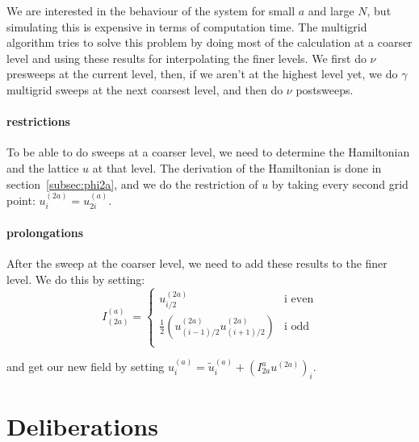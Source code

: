 \documentclass{scrartcl}
\begin{document}
We are interested in the behaviour of the system for small $a$ and large $N$, but simulating this is expensive in terms of computation time. The multigrid algorithm tries to solve this problem by doing most of the calculation at a coarser level and using these results for interpolating the finer levels.
We first do $\nu$ presweeps at the current level, then, if we aren't at the highest level yet, we do $\gamma$ multigrid sweeps at the next coarsest level, and then do $\nu$ postsweeps.

\paragraph{restrictions}
To be able to do sweeps at a coarser level, we need to determine the Hamiltonian and the lattice $u$ at that level. The derivation of the Hamiltonian is done in section~\ref{subsec:phi2a}, and we do the restriction of $u$ by taking every second grid point: $u_i^{(2a)}=u_{2i}^{(a)}$.

\paragraph{prolongations}
After the sweep at the coarser level, we need to add these results to the finer level. We do this by setting:\[
I^{(a)}_{(2a)}=\begin{cases}
u_{i/2}^{(2a)}& \text{i even}\\
\frac{1}{2}\left(u_{(i-1)/2}^{(2a)}u_{(i+1)/2}^{(2a)}\right) & \text{i odd}\\
\end{cases}
\]

and get our new field by setting $u_i^{(a)}=\tilde{u}_i^{(a)}+(I_{2a}^au^{(2a)})_i$.

\section{Deliberations}
\end{document}
